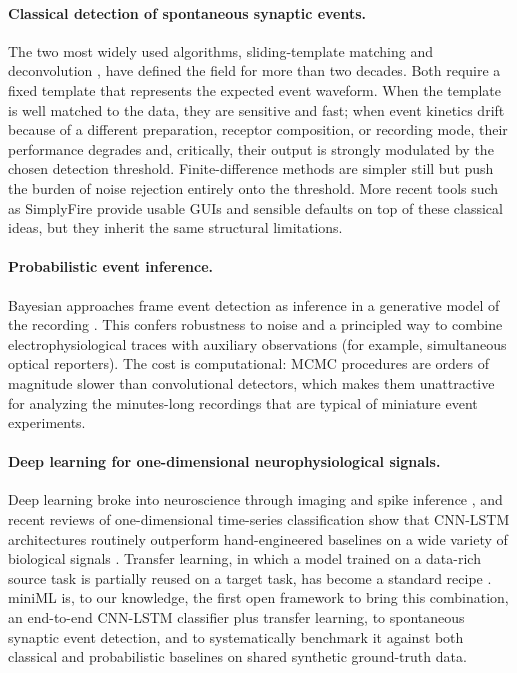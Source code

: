 \paragraph{Classical detection of spontaneous synaptic events.}
The two most widely used algorithms, sliding-template matching \citep{clements1997detection} and deconvolution \citep{pernia2012deconvolution}, have defined the field for more than two decades. Both require a fixed template that represents the expected event waveform. When the template is well matched to the data, they are sensitive and fast; when event kinetics drift because of a different preparation, receptor composition, or recording mode, their performance degrades and, critically, their output is strongly modulated by the chosen detection threshold. Finite-difference methods \citep{kudoh2002template} are simpler still but push the burden of noise rejection entirely onto the threshold. More recent tools such as SimplyFire \citep{mori2024simplyfire} provide usable GUIs and sensible defaults on top of these classical ideas, but they inherit the same structural limitations.

\paragraph{Probabilistic event inference.}
Bayesian approaches frame event detection as inference in a generative model of the recording \citep{merel2016bayesian}. This confers robustness to noise and a principled way to combine electrophysiological traces with auxiliary observations (for example, simultaneous optical reporters). The cost is computational: MCMC procedures are orders of magnitude slower than convolutional detectors, which makes them unattractive for analyzing the minutes-long recordings that are typical of miniature event experiments.

\paragraph{Deep learning for one-dimensional neurophysiological signals.}
Deep learning broke into neuroscience through imaging and spike inference \citep{lecun2015deep, rupprecht2021cascade}, and recent reviews of one-dimensional time-series classification show that CNN-LSTM architectures routinely outperform hand-engineered baselines on a wide variety of biological signals \citep{fawaz2019deeptsc}. Transfer learning, in which a model trained on a data-rich source task is partially reused on a target task, has become a standard recipe \citep{yosinski2014transferable, theodoris2023transfer}. miniML is, to our knowledge, the first open framework to bring this combination, an end-to-end CNN-LSTM classifier plus transfer learning, to spontaneous synaptic event detection, and to systematically benchmark it against both classical and probabilistic baselines on shared synthetic ground-truth data.

